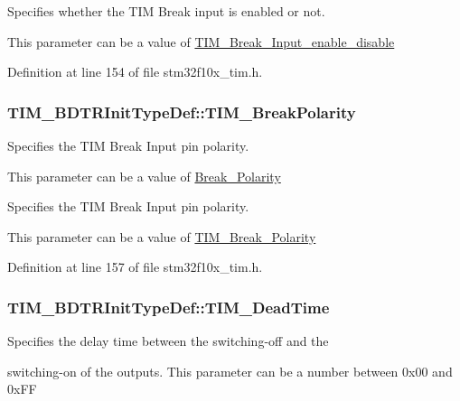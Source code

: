 \begin{DoxyVerb}            Specifies whether the TIM Break input is enabled or not. 
\end{DoxyVerb}
 This parameter can be a value of \hyperlink{group___t_i_m___break___input__enable__disable}{T\-I\-M\-\_\-\-Break\-\_\-\-Input\-\_\-enable\-\_\-disable} 

Definition at line 154 of file stm32f10x\-\_\-tim.\-h.

\hypertarget{struct_t_i_m___b_d_t_r_init_type_def_a5731e4e786b66f35cfe4798d6157619e}{
\subsubsection[{T\-I\-M\-\_\-\-Break\-Polarity}]{ T\-I\-M\-\_\-\-B\-D\-T\-R\-Init\-Type\-Def\-::\-T\-I\-M\-\_\-\-Break\-Polarity}}\label{struct_t_i_m___b_d_t_r_init_type_def_a5731e4e786b66f35cfe4798d6157619e}
\begin{DoxyVerb}    Specifies the TIM Break Input pin polarity.
\end{DoxyVerb}
 This parameter can be a value of \hyperlink{group___break___polarity}{Break\-\_\-\-Polarity}

\begin{DoxyVerb}    Specifies the TIM Break Input pin polarity.
\end{DoxyVerb}
 This parameter can be a value of \hyperlink{group___t_i_m___break___polarity}{T\-I\-M\-\_\-\-Break\-\_\-\-Polarity} 

Definition at line 157 of file stm32f10x\-\_\-tim.\-h.

\hypertarget{struct_t_i_m___b_d_t_r_init_type_def_a01ccbaffccdb3068b8a60c912579b1a2}{
\subsubsection[{T\-I\-M\-\_\-\-Dead\-Time}]{ T\-I\-M\-\_\-\-B\-D\-T\-R\-Init\-Type\-Def\-::\-T\-I\-M\-\_\-\-Dead\-Time}}\label{struct_t_i_m___b_d_t_r_init_type_def_a01ccbaffccdb3068b8a60c912579b1a2}
\begin{DoxyVerb}         Specifies the delay time between the switching-off and the
\end{DoxyVerb}
 switching-\/on of the outputs. This parameter can be a number between 0x00 and 0x\-F\-F 

